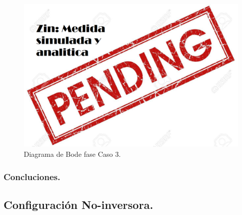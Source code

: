 \begin{figure}[H]	
	\centering
	\includegraphics[width=\textwidth]{Ejercicio1/Imagenes/BodephC3.png}
	\caption{Diagrama de Bode fase Caso 3.}
	\label{fig:BodephC3}
\end{figure} 
\subsubsection{Concluciones.}
\subsection{Configuración No-inversora.}
